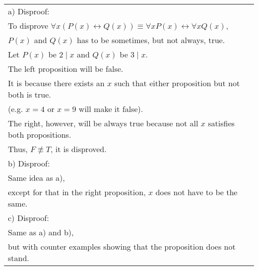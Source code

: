 \documentclass[12pt]{exam}
\begin{document}
\begin{solution}
\begin{tabular}{ll}
 a) Disproof:\\
 To disprove $\forall x(P(x) \leftrightarrow Q(x)) \equiv \forall x P(x) \leftrightarrow \forall x Q(x)$,\\
 $P(x)$ and $Q(x)$ has to be sometimes, but not always, true.\\
 Let $P(x)$ be $2 \mid x$ and $Q(x)$ be $3 \mid x$.\\
 The left proposition will be false.\\
 It is because there exists an $x$ such that either proposition but not both is true.\\
 (e.g. $x=4$ or $x=9$ will make it false).\\
 The right, however, will be always true because not all $x$ satisfies both propositions.\\
 Thus, $F \not \equiv T$, it is disproved.\\
 b) Disproof:\\
 Same idea as a),\\
 except for that in the right proposition, $x$ does not have to be the same.\\
 c) Disproof:\\
 Same as a) and b),\\
 but with counter examples showing that the proposition does not stand.
\end{tabular}
\end{solution}
\end{document}
